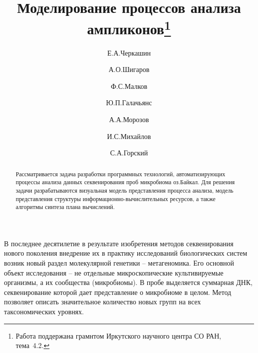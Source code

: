 \documentclass[12pt]{llncs}  %
\begin{document}
%

\title{Моделирование процессов анализа ампликонов\thanks{Работа поддержана грамнтом Иркутского научного центра СО РАН, тема\textnumero~4.2.}}
\author{Е.А.Черкашин  %
  \and  %
  А.О.Шигаров \and
  Ф.С.Малков \and
  Ю.П.Галачьянс \and
  А.А.Морозов \and
  И.С.Михайлов \and
  С.А.Горский
} %


\maketitle

\begin{abstract}
Рассматривается задача разработки программных технологий, автоматизирующих процессы анализа данных секвенирования проб микробиома оз.Байкал.  Для решения задачи разрабатываются визуальная модель представления процесса анализа, модель представления структуры информационно-вычислительных ресурсов, а также алгоритмы синтеза плана вычислений.

\end{abstract}

В последнее десятилетие в результате изобретения методов секвенирования нового поколения внедрение их в практику исследований биологических систем возник новый раздел молекулярной генетики -- метагеномика. Его основной объект исследования -- не отдельные микроскопические культивируемые организмы, а их сообщества (микробиомы).  В пробе выделяется суммарная ДНК, секвенирование которой дает представление  о микробиоме в целом.  Метод позволяет описать значительное количество новых групп на всех таксономических уровнях.
\end{document}
